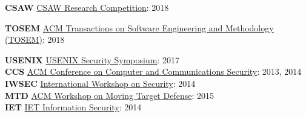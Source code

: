 

\begin{cvparagraph}
    \textbf{CSAW}  \hspace*{1pt} \href{https://csaw.engineering.nyu.edu/}{CSAW Research Competition}: 2018 \\
\end{cvparagraph}


\begin{cvparagraph}
    \textbf{TOSEM} \hspace*{1pt} \href{https://tosem.acm.org/} {ACM Transactions on Software Engineering and Methodology (TOSEM)}: 2018\\
\end{cvparagraph}


\begin{cvparagraph}
    \textbf{USENIX} \hspace*{1pt} \href{https://www.usenix.org/conference/usenixsecurity17} {USENIX Security Symposium}: 2017\\
    \textbf{CCS} \hspace*{17pt} \href{https://www.sigsac.org/ccs/CCS2014/}
        {ACM Conference on Computer and Communications Security}: 2013, 2014\\
    \textbf{IWSEC} \hspace*{6pt} \href{http://www.iwsec.org/2014/}{International Workshop on Security}: 2014 \\
    \textbf{MTD} \hspace*{15pt}
    \href{http://mtd.mobicloud.asu.edu/}{ACM Workshop on Moving Target Defense}: 2015\\
    \textbf{IET} \hspace*{20pt}
    \href{http://digital-library.theiet.org/content/journals/iet-ifs}{IET Information Security}: 2014
\end{cvparagraph}

